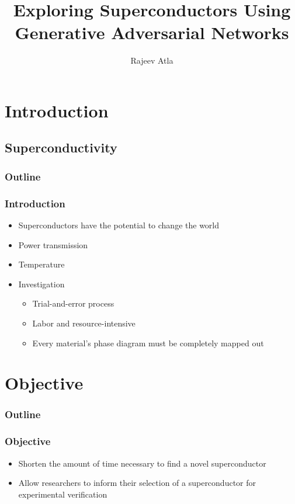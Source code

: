 \documentclass[12pt]{beamer}
\title{Exploring Superconductors Using Generative Adversarial Networks}
\author[Rajeev Atla]
{Rajeev Atla}
\institute[JPS]
{
  John P. Stevens High School
}
\begin{document}
\frame{\titlepage}



\section{Introduction}
\subsection{Superconductivity}

\begin{frame}
\frametitle{Outline}
\tableofcontents[currentsection]
\end{frame}






\begin{frame}
\frametitle{Introduction}
\begin{itemize}
  \pause
  \item Superconductors have the potential to change the world
  \pause
  \item Power transmission
  \pause
  \item Temperature
  \pause
  \item Investigation
  \pause
  \begin{itemize}
      \item Trial-and-error process
      \pause
      \item Labor and resource-intensive
      \pause
      \item Every material's phase diagram must be completely mapped out
  \end{itemize}
\end{itemize}
\end{frame}





\section{Objective}
\begin{frame}
\frametitle{Outline}
\tableofcontents[currentsection]
\end{frame}

\begin{frame}
\frametitle{Objective}

\begin{itemize}
    \item Shorten the amount of time necessary to find a novel superconductor
    \pause
    \item Allow researchers to inform their selection of a superconductor for experimental verification
\end{itemize}

\end{frame}
\end{document}
